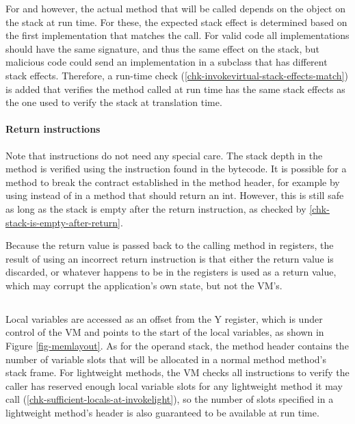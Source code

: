 For  and  however, the actual method that will be called depends on the object on the stack at run time. For these, the expected stack effect is determined based on the first implementation that matches the call. For valid code all implementations should have the same signature, and thus the same effect on the stack, but malicious code could send an implementation in a subclass that has different stack effects. Therefore, a run-time check (\ref{chk-invokevirtual-stack-effects-match}) is added that verifies the method called at run time has the same stack effects as the one used to verify the stack at translation time.

\paragraph{Return instructions}
Note that  instructions do not need any special care. The stack depth in the method is verified using the instruction found in the bytecode. It is possible for a method to break the contract established in the method header, for example by using  instead of  in a method that should return an int. However, this is still safe as long as the stack is empty after the return instruction, as checked by \ref{chk-stack-is-empty-after-return}.

Because the return value is passed back to the calling method in registers, the result of using an incorrect return instruction is that either the return value is discarded, or whatever happens to be in the registers is used as a return value, which may corrupt the application's own state, but not the VM's.

\subsection{}
Local variables are accessed as an offset from the Y register, which is under control of the VM and points to the start of the local variables, as shown in Figure \ref{fig-memlayout}. As for the operand stack, the method header contains the number of variable slots that will be allocated in a normal method method's stack frame. For lightweight methods, the VM checks all  instructions to verify the caller has reserved enough local variable slots for any lightweight method it may call (\ref{chk-sufficient-locals-at-invokelight}), so the number of slots specified in a lightweight method's header is also guaranteed to be available at run time.

